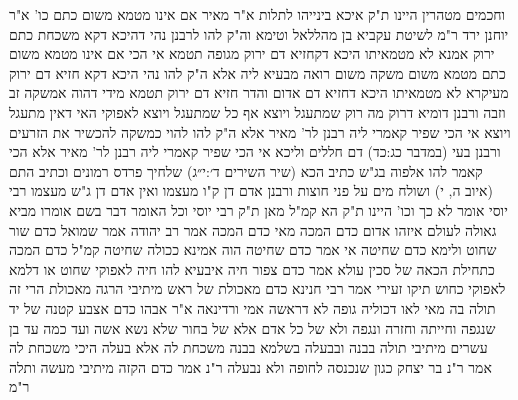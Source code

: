 \documentclass[12pt, openany]{book}
\begin{document}
{וחכמים מטהרין היינו ת"ק איכא בינייהו לתלות
א"ר מאיר אם אינו מטמא משום כתם כו'
א"ר יוחנן ירד ר"מ לשיטת עקביא בן מהללאל וטימא וה"ק להו לרבנן נהי דהיכא דקא משכחת כתם ירוק אמנא לא מטמאיתו היכא דקחזיא דם ירוק מגופה תטמא 
אי הכי אם אינו מטמא משום כתם מטמא משום משקה משום רואה מבעיא ליה 
אלא ה"ק להו נהי היכא דקא חזיא דם ירוק מעיקרא לא מטמאיתו היכא דחזיא דם אדום והדר חזיא דם ירוק תטמא מידי דהוה אמשקה זב וזבה 
ורבנן דומיא דרוק מה רוק שמתעגל ויוצא אף כל שמתעגל ויוצא לאפוקי האי דאין מתעגל ויוצא אי הכי שפיר קאמרי ליה רבנן לר' מאיר 
אלא ה"ק להו להוי כמשקה להכשיר את הזרעים ורבנן בעי (במדבר כג:כד) דם חללים וליכא אי הכי שפיר קאמרי ליה רבנן לר' מאיר 
אלא הכי קאמר להו אלפוה בג"ש כתיב הכא (שיר השירים ד׳:י״ג) שלחיך פרדס רמונים וכתיב התם (איוב ה, י) ושולח מים על פני חוצות 
ורבנן אדם דן ק"ו מעצמו ואין אדם דן ג"ש מעצמו
רבי יוסי אומר לא כך וכו' היינו ת"ק הא קמ"ל מאן ת"ק רבי יוסי וכל האומר דבר בשם אומרו מביא גאולה לעולם
איזהו אדום כדם המכה מאי כדם המכה אמר רב יהודה אמר שמואל כדם שור שחוט 
ולימא כדם שחיטה אי אמר כדם שחיטה הוה אמינא ככולה שחיטה קמ"ל כדם המכה כתחילת הכאה של סכין 
עולא אמר כדם צפור חיה איבעיא להו חיה לאפוקי שחוט או דלמא לאפוקי כחוש תיקו 
זעירי אמר רבי חנינא כדם מאכולת של ראש מיתיבי הרגה מאכולת הרי זה תולה בה מאי לאו דכוליה גופה לא דראשה 
אמי ורדינאה א"ר אבהו כדם אצבע קטנה של יד שנגפה וחייתה וחזרה ונגפה ולא של כל אדם אלא של בחור שלא נשא אשה ועד כמה עד בן עשרים 
מיתיבי תולה בבנה ובבעלה בשלמא בבנה משכחת לה אלא בעלה היכי משכחת לה 
אמר ר"נ בר יצחק כגון שנכנסה לחופה ולא נבעלה 
ר"נ אמר כדם הקזה מיתיבי מעשה ותלה ר"מ}
\end{document}
